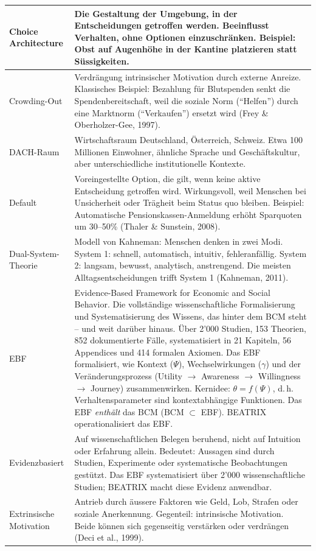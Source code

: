 \documentclass[11pt,a4paper]{article}
\begin{document}
\begin{longtable}{@{}L{4cm}L{10cm}@{}}
\midrule
Choice Architecture & Die Gestaltung der Umgebung, in der Entscheidungen getroffen werden. Beeinflusst Verhalten, ohne Optionen einzuschränken. Beispiel: Obst auf Augenhöhe in der Kantine platzieren statt Süssigkeiten. \\
\midrule
Crowding-Out & Verdrängung intrinsischer Motivation durch externe Anreize. Klassisches Beispiel: Bezahlung für Blutspenden senkt die Spendenbereitschaft, weil die soziale Norm (``Helfen'') durch eine Marktnorm (``Verkaufen'') ersetzt wird (Frey \& Oberholzer-Gee, 1997). \\
\midrule
DACH-Raum & Wirtschaftsraum Deutschland, Österreich, Schweiz. Etwa 100 Millionen Einwohner, ähnliche Sprache und Geschäftskultur, aber unterschiedliche institutionelle Kontexte. \\
\midrule
Default & Voreingestellte Option, die gilt, wenn keine aktive Entscheidung getroffen wird. Wirkungsvoll, weil Menschen bei Unsicherheit oder Trägheit beim Status quo bleiben. Beispiel: Automatische Pensionskassen-Anmeldung erhöht Sparquoten um 30--50\% (Thaler \& Sunstein, 2008). \\
\midrule
Dual-System-Theorie & Modell von Kahneman: Menschen denken in zwei Modi. System 1: schnell, automatisch, intuitiv, fehleranfällig. System 2: langsam, bewusst, analytisch, anstrengend. Die meisten Alltagsentscheidungen trifft System 1 (Kahneman, 2011). \\
\midrule
EBF & Evidence-Based Framework for Economic and Social Behavior. Die vollständige wissenschaftliche Formalisierung und Systematisierung des Wissens, das hinter dem BCM steht -- und weit darüber hinaus. Über 2'000 Studien, 153 Theorien, 852 dokumentierte Fälle, systematisiert in 21 Kapiteln, 56 Appendices und 414 formalen Axiomen. Das EBF formalisiert, wie Kontext ($\Psi$), Wechselwirkungen ($\gamma$) und der Veränderungsprozess (Utility $\rightarrow$ Awareness $\rightarrow$ Willingness $\rightarrow$ Journey) zusammenwirken. Kernidee: $\theta = f(\Psi)$, d.\,h. Verhaltensparameter sind kontextabhängige Funktionen. Das EBF \emph{enthält} das BCM (BCM $\subset$ EBF). BEATRIX operationalisiert das EBF. \\
\midrule
Evidenzbasiert & Auf wissenschaftlichen Belegen beruhend, nicht auf Intuition oder Erfahrung allein. Bedeutet: Aussagen sind durch Studien, Experimente oder systematische Beobachtungen gestützt. Das EBF systematisiert über 2'000 wissenschaftliche Studien; BEATRIX macht diese Evidenz anwendbar. \\
\midrule
Extrinsische Motivation & Antrieb durch äussere Faktoren wie Geld, Lob, Strafen oder soziale Anerkennung. Gegenteil: intrinsische Motivation. Beide können sich gegenseitig verstärken oder verdrängen (Deci et al., 1999). \\

\end{longtable}
\end{document}
